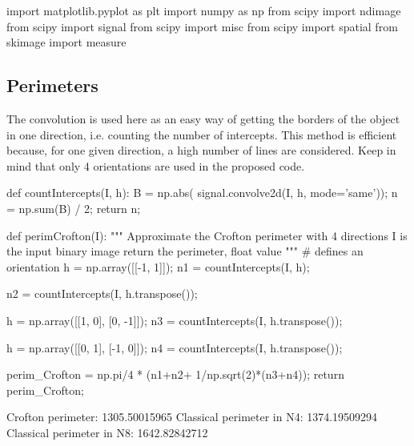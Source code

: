\def\QRCODE{TB_image_TUT.IMG.image_characterization_pythonqrcode.png}
\def\QRPAGE{http://www.iptutorials.science/tree/master/TB_image/TUT.IMG.image_characterization/python}

\begin{python}
import matplotlib.pyplot as plt
import numpy as np
from scipy import ndimage
from scipy import signal
from scipy import misc
from scipy import spatial
from skimage import measure
\end{python}


\subsection{Perimeters}
The convolution is used here as an easy way of getting the borders of the object in one direction, i.e. counting the number of intercepts. This method is efficient because, for one given direction, a high number of lines are considered. Keep in mind that only 4 orientations are used in the proposed code.

\begin{python}
def countIntercepts(I, h):
    B = np.abs( signal.convolve2d(I, h, mode='same'));
    n = np.sum(B) / 2;
    return n;

def perimCrofton(I):
    """
    Approximate the Crofton perimeter with 4 directions
    I is the input binary image
    return the perimeter, float value
    """
    # defines an orientation
    h = np.array([[-1, 1]]);
    n1 = countIntercepts(I, h);
    
    n2 = countIntercepts(I, h.transpose());
    
    h = np.array([[1, 0], [0, -1]]);
    n3 = countIntercepts(I, h.transpose());
    
    h = np.array([[0, 1], [-1, 0]]);
    n4 = countIntercepts(I, h.transpose());
    
    perim_Crofton = np.pi/4 * (n1+n2+ 1/np.sqrt(2)*(n3+n4));
    return perim_Crofton;
\end{python}

\begin{sh}
Crofton perimeter:  1305.50015965
Classical perimeter in N4:  1374.19509294
Classical perimeter in N8:  1642.82842712
\end{sh}

